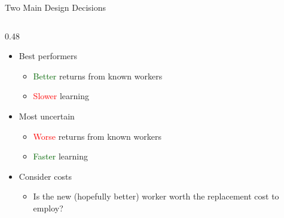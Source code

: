 \documentclass[10pt,aspectratio=169]{beamer}
\begin{document}
\begin{frame}[t]{Two Main Design Decisions}
\begin{columns}[t]
\begin{column}{0.48\textwidth}
        \vspace{0.5em}
        \raggedright
        \begin{itemize}
            \item Best performers
            \begin{itemize}
                \item \textcolor{darkgreen}{Better} returns from known workers
                \item \textcolor{red}{Slower} learning
            \end{itemize}
            \item Most uncertain
            \begin{itemize}
                \item \textcolor{red}{Worse} returns from known workers
                \item \textcolor{darkgreen}{Faster} learning
            \end{itemize}
            \item Consider costs
            \begin{itemize}
                \item Is the new (hopefully better) worker worth the replacement cost to employ?
            \end{itemize}
        \end{itemize}
    \end{column}
\end{columns}
\end{frame}
\end{document}

